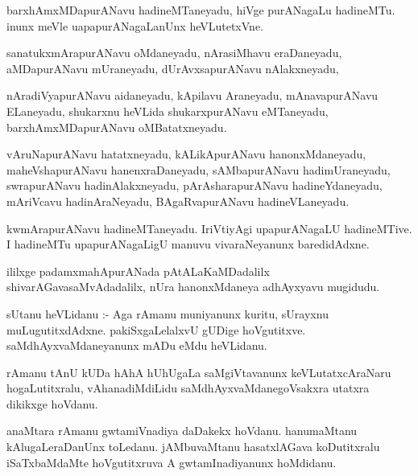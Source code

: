 \documentclass{article}
\begin{document}
\begin{mn}
barxhAmxMDapurANavu  hadineMTaneyadu,  hiVge  purANagaLu  hadineMTu.  inunx  meVle  uapapurANagaLanUnx  heVLutetxVne.
\end{mn}

\begin{mn}
sanatukxmArapurANavu  oMdaneyadu,  nArasiMhavu  eraDaneyadu,  aMDapurANavu  mUraneyadu,  dUrAvxsapurANavu  nAlakxneyadu,
\end{mn}

\begin{mn}
nAradiVyapurANavu  aidaneyadu,  kApilavu  Araneyadu,  mAnavapurANavu  ELaneyadu,  shukarxnu  heVLida  
shukarxpurANavu  eMTaneyadu,  barxhAmxMDapurANavu  oMBatatxneyadu.
\end{mn}

\begin{mn}
vAruNapurANavu  hatatxneyadu,  kALikApurANavu  hanonxMdaneyadu,  maheVshapurANavu  hanenxraDaneyadu,  
sAMbapurANavu  hadimUraneyadu,  swrapurANavu  hadinAlakxneyadu,  pArAsharapurANavu  hadineYdaneyadu,  
mAriVcavu  hadinAraNeyadu,  BAgaRvapurANavu  hadineVLaneyadu.
\end{mn}

\begin{mn}
kwmArapurANavu  hadineMTaneyadu.  IriVtiyAgi  upapurANagaLU  hadineMTive.  I  hadineMTu  upapurANagaLigU 
 manuvu  vivaraNeyanunx  baredidAdxne.
\end{mn}

\begin{mn}
ililxge  padamxmahApurANada  pAtALaKaMDadalilx  shivarAGavasaMvAdadalilx,  nUra  hanonxMdaneya  adhAyxyavu  mugidudu.
\end{mn}




\begin{mn}
sUtanu  heVLidanu :- Aga  rAmanu  muniyanunx  kuritu,  sUrayxnu  muLugutitxdAdxne.  pakiSxgaLelalxvU  
gUDige  hoVgutitxve.  saMdhAyxvaMdaneyanunx  mADu  eMdu  heVLidanu.
\end{mn}

\begin{mn}
rAmanu  tAnU  kUDa  hAhA  hUhUgaLa  saMgiVtavanunx  keVLutatxcAraNaru  hogaLutitxralu,  vAhanadiMdiLidu  
saMdhAyxvaMdanegoVsakxra  utatxra  dikikxge  hoVdanu.
\end{mn}

\begin{mn}
anaMtara  rAmanu  gwtamiVnadiya  daDakekx  hoVdanu.  hanumaMtanu  kAlugaLeraDanUnx  toLedanu.  jAMbuvaMtanu  
hasatxlAGava  koDutitxralu  iSaTxbaMdaMte  hoVgutitxruva  A  gwtamInadiyanunx  hoMdidanu.
\end{mn}
\end{document}
